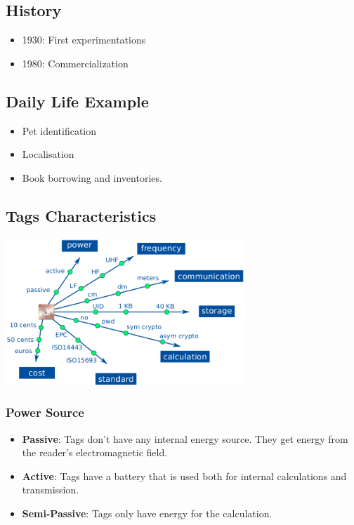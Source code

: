\subsection{History}

\begin{itemize}
    \item 1930: First experimentations
    \item 1980: Commercialization
\end{itemize}


\subsection{Daily Life Example}

\begin{itemize}
    \item Pet identification
    \item Localisation
    \item Book borrowing and inventories.
\end{itemize}

\subsection{Tags Characteristics}
\begin{center}
    \includegraphics[width=9cm]{img/characRFID}
\end{center}

\subsubsection{Power Source}
\begin{itemize}
    \item \textbf{Passive}:  Tags don't have any internal energy source. They
    get energy from the reader's electromagnetic field.
\item \textbf{Active}:  Tags have a battery that is used both for internal
    calculations and transmission.
\item \textbf{Semi-Passive}:  Tags only have energy for the calculation.
\end{itemize}


